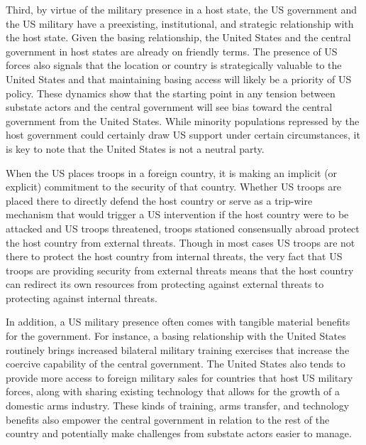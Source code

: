 Third, by virtue of the military presence in a host state, the US government and the US military have a preexisting, institutional, and strategic relationship with the host state. Given the basing relationship, the United States and the central government in host states are already on friendly terms. The presence of US forces also signals that the location or country is strategically valuable to the United States and that maintaining basing access will likely be a priority of US policy.\cite{StraversElKurd2018} These dynamics show that the starting point in any tension between substate actors and the central government will see bias toward the central government from the United States. While minority populations repressed by the host government could certainly draw US support under certain circumstances, it is key to note that the United States is not a neutral party. 

When the US places troops in a foreign country, it is making an implicit (or explicit) commitment to the security of that country. Whether US troops are placed there to directly defend the host country or serve as a trip-wire mechanism that would trigger a US intervention if the host country were to be attacked and US troops threatened, troops stationed consensually abroad protect the host country from external threats.\cite{Schelling1966}  Though in most cases US troops are not there to protect the host country from internal threats, the very fact that US troops are providing security from external threats means that the host country can redirect its own resources from protecting against external threats to protecting against internal threats.\cite{machainandmorgan2013,allenetal2016,allenetal2017}

In addition, a US military presence often comes with tangible material benefits for the government. For instance, a basing relationship with the United States routinely brings increased bilateral military training exercises that increase the coercive capability of the central government.\cite{Ruby2010} The United States also tends to provide more access to foreign military sales for countries that host US military forces, along with sharing existing technology that allows for the growth of a domestic arms industry. These kinds of training, arms transfer, and technology benefits also empower the central government in relation to the rest of the country and potentially make challenges from substate actors easier to manage. 

